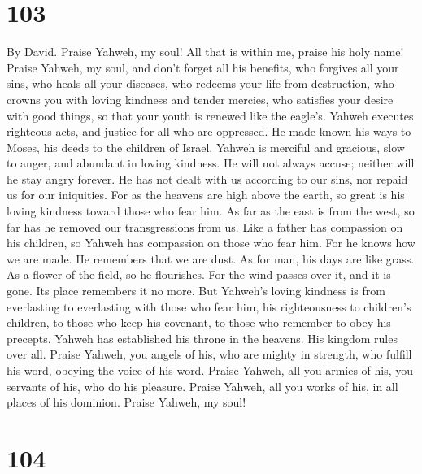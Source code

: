 \hypertarget{section-95}{%
\section{103}\label{section-95}}

By David.  Praise Yahweh, my soul! All that is within me,
praise his holy name!  Praise Yahweh, my soul, and don't
forget all his benefits,  who forgives all your sins, who
heals all your diseases,  who redeems your life from
destruction, who crowns you with loving kindness and tender mercies,
 who satisfies your desire with good things, so that your
youth is renewed like the eagle's.  Yahweh executes
righteous acts, and justice for all who are oppressed.  He
made known his ways to Moses, his deeds to the children of Israel.
 Yahweh is merciful and gracious, slow to anger, and
abundant in loving kindness.  He will not always accuse;
neither will he stay angry forever.  He has not dealt
with us according to our sins, nor repaid us for our iniquities.
 For as the heavens are high above the earth, so great is
his loving kindness toward those who fear him.  As far as
the east is from the west, so far has he removed our transgressions from
us.  Like a father has compassion on his children, so
Yahweh has compassion on those who fear him.  For he
knows how we are made. He remembers that we are dust.  As
for man, his days are like grass. As a flower of the field, so he
flourishes.  For the wind passes over it, and it is gone.
Its place remembers it no more.  But Yahweh's loving
kindness is from everlasting to everlasting with those who fear him, his
righteousness to children's children,  to those who keep
his covenant, to those who remember to obey his precepts.
 Yahweh has established his throne in the heavens. His
kingdom rules over all.  Praise Yahweh, you angels of
his, who are mighty in strength, who fulfill his word, obeying the voice
of his word.  Praise Yahweh, all you armies of his, you
servants of his, who do his pleasure.  Praise Yahweh, all
you works of his, in all places of his dominion. Praise Yahweh, my soul!

\hypertarget{section-96}{%
\section{104}\label{section-96}}

